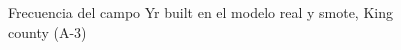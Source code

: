 \begin{figure}[H]
    \centering
    
    \caption{Frecuencia del campo Yr built en el modelo real y smote, King county (A-3)}
    \label{frecuency-smote-yr built}
\end{figure}